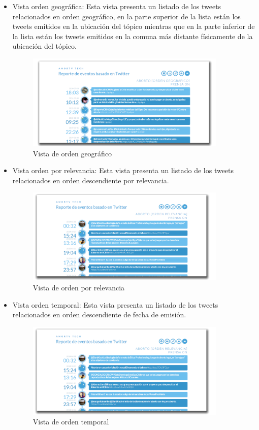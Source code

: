 \begin{itemize}
	\item {Vista orden geográfica}: Esta vista presenta un listado de los tweets relacionados en orden geográfico, en la parte superior de la lista están los tweets emitidos en la ubicación del tópico mientras que en la parte inferior de la lista están los tweets emitidos en la comuna más distante físicamente de la ubicación del tópico.
	\begin{figure}[H]
		\centering
		\includegraphics[width=0.9\textwidth]{imgs/vistas_geo.PNG}
		\caption{Vista de orden geográfico}
		\label{fig:vista_geo}
	\end{figure}
	
	\item {Vista orden por relevancia}: Esta vista presenta un listado de los tweets relacionados en orden descendiente por relevancia.
	\begin{figure}[H]
		\centering
		\includegraphics[width=0.9\textwidth]{imgs/vistas_rel.PNG}
		\caption{Vista de orden por relevancia}
		\label{fig:vista_rel}
	\end{figure}
		
	\item {Vista orden temporal}: Esta vista presenta un listado de los tweets relacionados en orden descendiente de fecha de emisión.
	\begin{figure}[H]
		\centering
		\includegraphics[width=0.9\textwidth]{imgs/vistas_rel.PNG}
		\caption{Vista de orden temporal}
		\label{fig:vista_temp}
	\end{figure}
	

\end{itemize}

